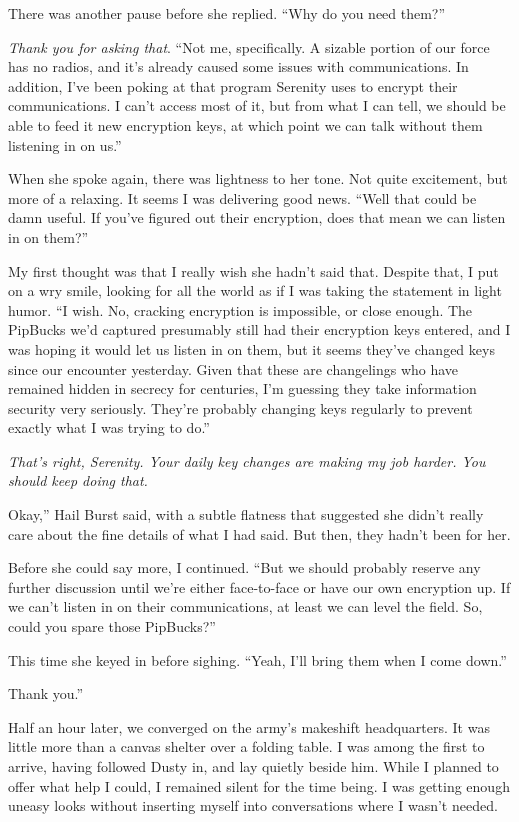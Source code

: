 There was another pause before she replied. “Why do you need them?”

\textit{Thank you for asking that}. “Not me, specifically. A sizable portion of our force has no radios, and it’s already caused some issues with communications. In addition, I’ve been poking at that program Serenity uses to encrypt their communications. I can’t access most of it, but from what I can tell, we should be able to feed it new encryption keys, at which point we can talk without them listening in on us.”

When she spoke again, there was lightness to her tone. Not quite excitement, but more of a relaxing. It seems I was delivering good news. “Well that could be damn useful. If you’ve figured out their encryption, does that mean we can listen in on them?”

My first thought was that I really wish she hadn’t said that. Despite that, I put on a wry smile, looking for all the world as if I was taking the statement in light humor. “I wish. No, cracking encryption is impossible, or close enough. The PipBucks we’d captured presumably still had their encryption keys entered, and I was hoping it would let us listen in on them, but it seems they’ve changed keys since our encounter yesterday. Given that these are changelings who have remained hidden in secrecy for centuries, I’m guessing they take information security very seriously. They’re probably changing keys regularly to prevent exactly what I was trying to do.”

\textit{That’s right, Serenity. Your daily key changes are making my job harder. You should keep doing that.}

\leavevmode{}Okay,” Hail Burst said, with a subtle flatness that suggested she didn’t really care about the fine details of what I had said. But then, they hadn’t been for her.

Before she could say more, I continued. “But we should probably reserve any further discussion until we’re either face-to-face or have our own encryption up. If we can’t listen in on their communications, at least we can level the field. So, could you spare those PipBucks?”

This time she keyed in before sighing. “Yeah, I’ll bring them when I come down.”

\leavevmode{}Thank you.”

{\br}%
Half an hour later, we converged on the army’s makeshift headquarters. It was little more than a canvas shelter over a folding table. I was among the first to arrive, having followed Dusty in, and lay quietly beside him. While I planned to offer what help I could, I remained silent for the time being. I was getting enough uneasy looks without inserting myself into conversations where I wasn’t needed.

